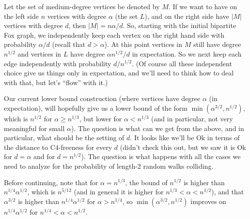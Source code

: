 \documentclass{article}
\begin{document}
Let the set of medium-degree vertices be denoted by $M$. If we want to have on the left side $n$ vertices with degree $\alpha$ (the set $L$), and on the right side have $|M|$ vertices with degree $d$, then $|M| = n\alpha/d$. So, starting with the initial bipartite Fox graph, we independently keep each vertex on the right hand side with probability $\alpha/d$ (recall that $d>\alpha$). At this point vertices in $M$ still have degree $n^{1/2}$ and vertices in $L$ have degree $\alpha n^{1/2}/d$ in expectation. So we next keep each edge independently with probability $d/n^{1/2}$. (Of course all these independent choice give us things only in expectation, and we’ll need to think how to deal with that, but let’s ``flow'' with it.)

Our current lower bound construction (where vertices have degree $\alpha$ (in expectation), will hopefully give us a lower bound of the form $\min(\alpha^{3/2},n^{1/2})$, which is $n^{1/2}$ for $\alpha \geq n^{1/3}$, but lower for $\alpha < n^{1/3}$ (and in particular, not very meaningful for small $\alpha$).
The question is what can we get from the above, and in particular, what should be the setting of $d$. It looks like we'll be Ok in terms of the distance to C4-freeness for every $d$ (didn't check this out, but we saw it is Ok for $d= \alpha$ and for $d=n^{1/2}$). The question is what happens with all the cases we need to analyze for the probability of length-2 random walks colliding.

Before continuing, note that for $\alpha = n^{1/3}$, the bound of $n^{1/2}$ is higher than $n^{1/4}\alpha^{1/2}$, which is $n^{5/12}$ (and in general it is higher for $n^{1/3} < \alpha < n^{1/2}$), and that $\alpha^{3/2}$ is higher than $n^{1/4}\alpha^{1/2}$ for $\alpha > n^{1/4}$, so $\min(\alpha^{3/2},n^{1/2})$ improves on $n^{1/4}\alpha^{1/2}$ for $n^{1/4} < \alpha < n^{1/2}$.
\end{document}
